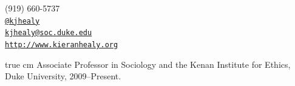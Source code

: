 \documentclass[11pt,article,oneside]{memoir}
\makeatletter
\def\myemail{kjhealy@soc.duke.edu}
\def\myweb{http://www.kieranhealy.org}
\def\myphone{(919) 660-5737}
\def\mytwitter{@kjhealy}
\makeatother
\begin{document}
\renewcommand{\labelitemi}{~} 

\def\ind{\hangindent=1 true cm\hangafter=1 \noindent}
\def\labelitemi{~}
\renewcommand{\labelitemii}{~}


\pagestyle{kjh}


\begin{minipage}[t]{2.95in}
  
\end{minipage}
\hfill     
\hfill
\begin{minipage}[t]{1.3in}
  \flushright \footnotesize  \addressblock \myphone \, \faPhone \\ 
  {\scriptsize  \texttt{\href{http://twitter.com/kjhealy}{\mytwitter}} \, \faTwitter }  \\ 
  {\scriptsize  \texttt{\href{mailto:\myemail}{\myemail}} \, \faEnvelope} \\
  {\scriptsize  \texttt{\href{\myweb}{\myweb}} \, \faGlobe}
\end{minipage}

\medskip

\reversemarginpar

\bigskip       


{}

\ind Associate Professor in Sociology and the Kenan Institute for Ethics, Duke University, 2009--Present.      
\end{document}

